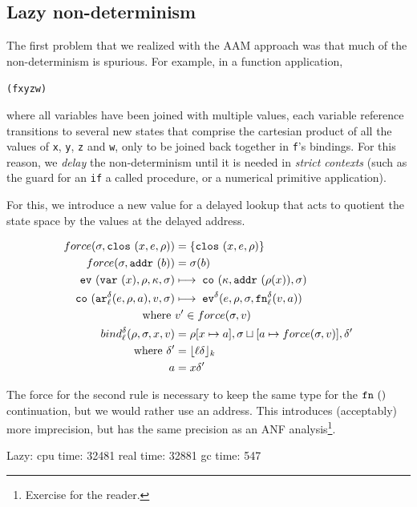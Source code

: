 \documentclass[preprint,onecolumn,9pt]{sigplanconf} %
\begin{document}
\subsection{Lazy non-determinism}

The first problem that we realized with the AAM approach was that much
of the non-determinism is spurious. For example, in a function
application,
\begin{alltt}
(f x y z w)
\end{alltt}
where all variables have been joined with multiple values, each
variable reference transitions to several new states that comprise the
cartesian product of all the values of {\tt x}, {\tt y}, {\tt z} and
{\tt w}, only to be joined back together in {\tt f}'s bindings. For
this reason, we {\it delay} the non-determinism until it is needed in
{\it strict contexts} (such as the guard for an {\tt if} a called
procedure, or a numerical primitive application). 

For this, we introduce a new value for a delayed lookup that acts to
quotient the state space by the values at the delayed address.

\begin{align*}
force(\msto,\clos{\mvar,\mexp,\menv}) &= \{\clos{\mvar,\mexp,\menv}\}\\
force(\msto,\saddr\maddralt) &= \msto(\maddralt)\\
\ev{\svar{\mvar},\menv,\mkont,\msto} &\machstep\; 
\co{\mkont,\saddr{\menv(\mvar)},\msto} \\
\co{\kar[^\mcntr_\mlab]{\mexp,\menv,\maddr},v,\msto}
&\machstep\;
\ev[^\mcntr]{\mexp,\menv,\msto,\kfn[^\mcntr_\mlab]{\mval,\maddr}} \\
\mbox{where } &\mval' \in force(\msto,\mval) \\
bind^\mcntr_\mlab(\menv,\msto,\mvar,\mval) &= \menv[\mvar \mapsto
  \maddr], \msto\sqcup[\maddr \mapsto force(\msto, \mval)], \mcntr' \\
\mbox{where } \mcntr' &= \lfloor\mlab\mcntr\rfloor_k \\
              \maddr &= \mvar\mcntr'
\end{align*}

The force for the second rule is necessary to keep the same type for
the \(\kfn{}\) continuation, but we would rather use an address. This
introduces (acceptably) more imprecision, but has the same precision as an ANF
analysis\footnote{Exercise for the reader.}.

Lazy:
   cpu time: 32481 real time: 32881 gc time: 547
\end{document}
